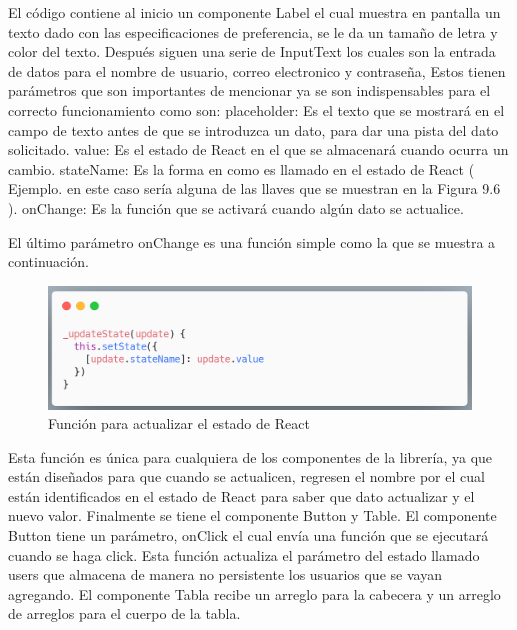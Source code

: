 El código contiene al inicio un componente Label el cual muestra en pantalla un texto dado con las especificaciones de preferencia, se le da un tamaño de letra y color del texto. Después siguen una serie de InputText los cuales son la entrada de datos para el nombre de usuario, correo electronico  y contraseña, Estos tienen parámetros que son importantes de mencionar ya se son indispensables para el correcto funcionamiento como son:
placeholder: Es el texto que se mostrará en el campo de texto antes de que se introduzca un dato, para dar una pista del dato solicitado.
value: Es el estado de React en el que se almacenará cuando ocurra un cambio.
stateName: Es la forma en como es llamado en el estado de React ( Ejemplo. en este caso sería alguna de las llaves que se muestran en la Figura 9.6 ).
onChange: Es la función que se activará cuando algún dato se actualice.

El último parámetro onChange es una función simple como la que se muestra a continuación. 

\newline
\begin{figure}[H]
    \includegraphics[width=1\textwidth]{./Imagenes/9.9}
   \centering 
    \caption[Función para actualizar el estado de React]{Función para actualizar el estado de React}
    \end{figure}
\newline

Esta función es única para cualquiera de los componentes de la librería, ya que están diseñados para que cuando se actualicen, regresen el nombre por el cual están identificados en el estado de React para saber que dato actualizar  y el nuevo valor.
Finalmente se tiene el componente Button y Table. El componente Button tiene un parámetro, onClick el cual envía una función que se ejecutará cuando se haga click. Esta función actualiza el parámetro del estado llamado users que almacena de manera no persistente los usuarios que se vayan agregando.
El componente Tabla recibe un arreglo para la cabecera y un arreglo de arreglos para el cuerpo de la tabla.


